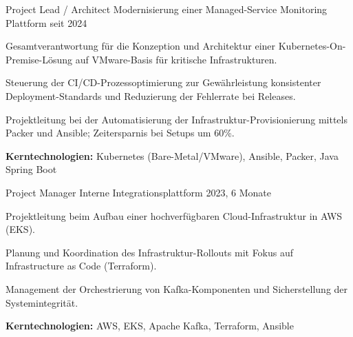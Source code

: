 

\begin{cventries}

  \cventry
    {Project Lead / Architect} %
    {Modernisierung einer Managed-Service Monitoring Plattform} %
    {} %
    {seit 2024} %
    {
      \begin{cvitems} %
        \item {Gesamtverantwortung für die Konzeption und Architektur einer Kubernetes-On-Premise-Lösung auf VMware-Basis für kritische Infrastrukturen.}
        \item {Steuerung der CI/CD-Prozessoptimierung zur Gewährleistung konsistenter Deployment-Standards und Reduzierung der Fehlerrate bei Releases.}
        \item {Projektleitung bei der Automatisierung der Infrastruktur-Provisionierung mittels Packer und Ansible; Zeitersparnis bei Setups um 60\%.}
        \item {\textbf{Kerntechnologien:} Kubernetes (Bare-Metal/VMware), Ansible, Packer, Java Spring Boot}
      \end{cvitems}
    }

\vspace{2mm}
  \cventry
    {Project Manager} %
    {Interne Integrationsplattform} %
    {} %
    {2023, 6 Monate} %
    {
      \begin{cvitems} %
        \item {Projektleitung beim Aufbau einer hochverfügbaren Cloud-Infrastruktur in AWS (EKS).}
        \item {Planung und Koordination des Infrastruktur-Rollouts mit Fokus auf Infrastructure as Code (Terraform).}
        \item {Management der Orchestrierung von Kafka-Komponenten und Sicherstellung der Systemintegrität.}
        \item {\textbf{Kerntechnologien:} AWS, EKS, Apache Kafka, Terraform, Ansible}
      \end{cvitems}
    }


\end{cventries}
